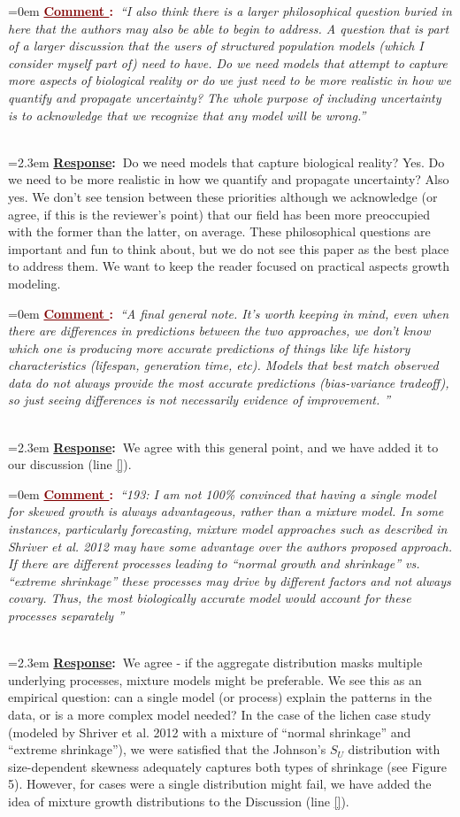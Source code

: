 \documentclass[12pt]{article}
\newcounter{cN}
\newcommand{\comment}[1]{
	\vspace{2em}
	\refstepcounter{cN} %
	\noindent \hangindent=0em \textbf{\textcolor{Maroon}{\uline{Comment \thecN}:~}}\emph{``#1''}
	}
\newcommand{\response}[1]{
	\\[0.25em]
	\hangindent=2.3em \textbf{\textcolor{NavyBlue}{\uline{Response}:~}}#1
	}
\newcommand{\spe}[1]{{\color{red}{#1}}}
\begin{document}
\comment{I also think there is a larger philosophical question buried in here that the authors may also be able to begin to address. A question that is part of a larger discussion that the users of structured population models (which I consider myself part of) need to have.  Do we need models that attempt to capture more aspects of biological reality or do we just need to be more realistic in how we quantify and propagate uncertainty? The whole purpose of including uncertainty is to acknowledge that we recognize that any model will be wrong.}
\response{Do we need models that capture biological reality? Yes. Do we need to be more realistic in how we quantify and propagate uncertainty? Also yes. We don't see tension between these priorities \spe{(because omitting a relevant feature of biological reality will likely distort uncertainty quantification)}
although we acknowledge (or agree, if this is the reviewer's point) that our field has been more preoccupied with the former than the latter, on average. These philosophical questions are important and fun to think about, but we do not see this paper as the best place to address them. We want to keep the reader focused on practical aspects growth modeling.}

\comment{A final general note.  It’s worth keeping in mind, even when there are differences in predictions between the two approaches, we don’t know which one is producing more accurate predictions of things like life history characteristics (lifespan, generation time, etc). Models that best match observed data do not always provide the most accurate predictions (bias-variance tradeoff), so just seeing differences is not necessarily evidence of improvement.  }
\response{We agree with this general point, and we have added it to our discussion (line \ref{}). }

\comment{193: I am not 100\% convinced that having a single model for skewed growth is always advantageous, rather than a mixture model. In some instances, particularly forecasting, mixture model approaches such as described in Shriver et al. 2012 may have some advantage over the authors proposed approach. If there are different processes leading to “normal growth and shrinkage” vs. “extreme shrinkage” these processes may drive by different factors and not always covary. Thus, the most biologically accurate model would account for these processes separately }
\response{We agree - if the aggregate distribution masks multiple underlying processes, mixture models might be preferable. We see this as an empirical question: can a single model (or process) explain the patterns in the data, or is a more complex model needed? In the case of the lichen case study (modeled by Shriver et al. 2012 with a mixture of ``normal shrinkage'' and ``extreme shrinkage''), we were satisfied that the Johnson's $S_{U}$ distribution with size-dependent skewness adequately captures both types of shrinkage (see Figure 5). However, for cases were a single distribution might fail, we have added the idea of mixture growth distributions to the Discussion (line \ref{}).}
\end{document}
